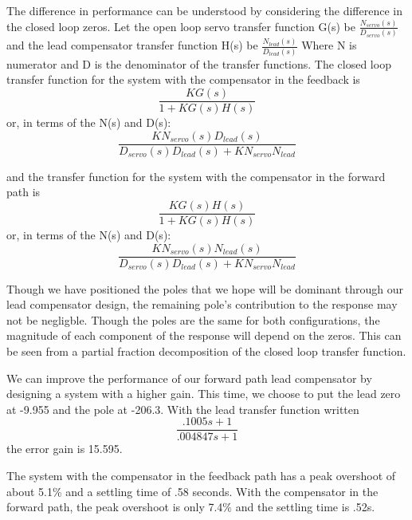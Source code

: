 \documentclass[11pt,a4paper]{article}
\begin{document}
The difference in performance can be understood by considering the difference in the closed loop zeros. Let the open loop servo transfer function G(s) be $\frac{N_{servo}(s)}{D_{servo}(s)}$ and the lead compensator transfer function H(s) be $\frac{N_{lead}(s)}{D_{lead}(s)}$ Where N is numerator and D is the denominator of the transfer functions. The closed loop transfer function for the system with the compensator in the feedback is
\begin{equation}
	\frac{KG(s)}{1+KG(s)H(s)}
\end{equation}
or, in terms of the N(s) and D(s):
\begin{equation}
	\frac{K N_{servo}(s) D_{lead}(s)}{D_{servo}(s) D_{lead}(s) + K N_{servo} N_{lead}}
\end{equation}


and the transfer function for the system with the compensator in the forward path is
\begin{equation}
	\frac{KG(s)H(s)}{1+KG(s)H(s)}
\end{equation}
or, in terms of the N(s) and D(s):
\begin{equation}
	\frac{K N_{servo}(s) N_{lead}(s)}{D_{servo}(s) D_{lead}(s) + K N_{servo} N_{lead}}
\end{equation}

Though we have positioned the poles that we hope will be dominant through our lead compensator design, the remaining pole's contribution to the response may not be negligble. Though the poles are the same for both configurations, the magnitude of each component of the response will depend on the zeros. This can be seen from a partial fraction decomposition of the closed loop transfer function.

We can improve the performance of our forward path lead compensator by designing a system with a higher gain. This time, we choose to put the lead zero at -9.955 and the pole at -206.3. With the lead transfer function written
\begin{equation}
	\frac{.1005s + 1}{.004847s + 1}
\end{equation}
 the error gain is 15.595.
 
 The system with the compensator in the feedback path has a peak overshoot of about 5.1\% and a settling time of .58 seconds. With the compensator in the forward path, the peak overshoot is only 7.4\% and the settling time is .52s.
\end{document}
